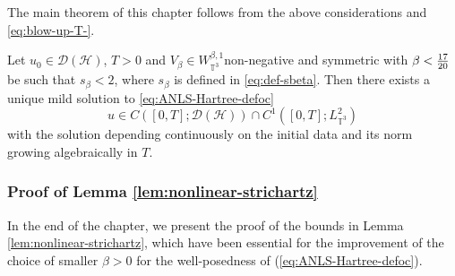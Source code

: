 The main theorem of this chapter follows from the above considerations and
\eqref{eq:blow-up-T-}.

\begin{thm}
  \label{thm:main}Let $u_0 \in \mathcal{D} (\mathcal{H})$, $T > 0$ and
  $V_{\beta} \in W_{\mathbb{T}^3}^{\beta, 1}$non-negative and symmetric with
  ${\color[HTML]{000000}\beta < \frac{17}{20}}$ be such that $s_{\beta} < 2$,
  where $s_{\beta}$ is defined in \eqref{eq:def-sbeta}. Then there exists a
  unique mild solution to \eqref{eq:ANLS-Hartree-defoc}
  \[ u \in C ([0, T] ; \mathcal{D} (\mathcal{H})) \cap C^1 ([0, T] ;
     L_{\mathbb{T}^3}^2) \]
  with the solution depending continuously on the initial data and its norm
  growing algebraically in $T.$
\end{thm}

\subsubsection{Proof of Lemma
\ref{lem:nonlinear-strichartz}}\label{sec:posteri-bound-proof}

In the end of the chapter, we present the proof of the bounds in Lemma
\ref{lem:nonlinear-strichartz}, which have been essential for the improvement
of the choice of smaller $\beta > 0$ for the well-posedness of
(\ref{eq:ANLS-Hartree-defoc}).

